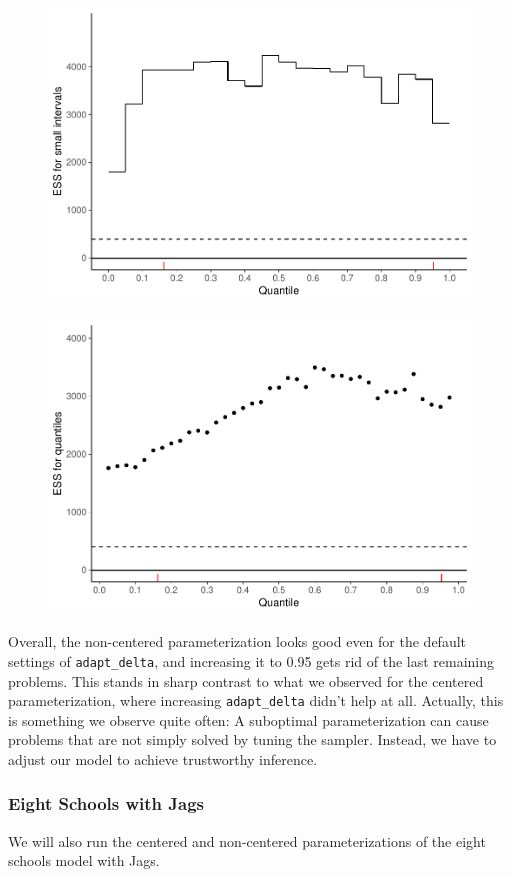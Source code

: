 \documentclass[american,]{article}
\begin{document}
\begin{figure}[t]
  \centering
  \includegraphics[width=0.6\linewidth]{graphics/local-ess-fit-ncp-tau-1.pdf}
\end{figure}

\begin{figure}[t]
  \centering
  \includegraphics[width=0.6\linewidth]{graphics/quantile-ess-fit-ncp-tau-1.pdf}
\end{figure}

Overall, the non-centered parameterization looks good even for the
default settings of \texttt{adapt\_delta}, and increasing it to 0.95
gets rid of the last remaining problems. This stands in sharp contrast
to what we observed for the centered parameterization, where increasing
\texttt{adapt\_delta} didn't help at all. Actually, this is something we
observe quite often: A suboptimal parameterization can cause problems
that are not simply solved by tuning the sampler. Instead, we have to
adjust our model to achieve trustworthy inference.

\hypertarget{eight-schools-with-jags}{%
\subsubsection*{Eight Schools with Jags}\label{eight-schools-with-jags}}

We will also run the centered and non-centered parameterizations of the
eight schools model with Jags.
\end{document}
